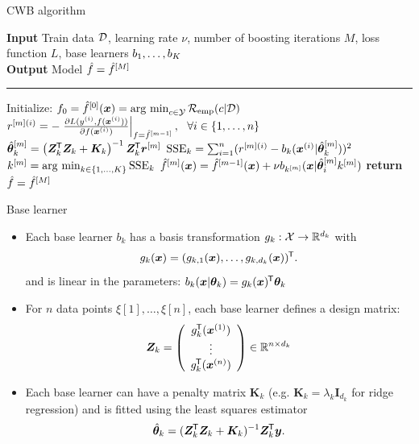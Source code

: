 \documentclass[t,10pt]{beamer}
\newcommand{\penMat}{\bm{K}}
\begin{document}
\begin{frame}{CWB algorithm}
  \addtocounter{algorithm}{-1}
  \begin{algorithm}[H]
  \footnotesize
  \caption{Vanilla CWB algorithm}\label{algo:cwb}
  \hspace*{\algorithmicindent} \textbf{Input} Train data $\D$, learning rate $\nu$, number of boosting iterations $M$, loss\\
  \hspace*{\algorithmicindent}  function $L$, base learners $b_1, \dots, b_\blK$\\
  \hspace*{\algorithmicindent} \textbf{Output} Model $\fh = \fmh[M]$\vspace{0.1cm}
  \hrule
  \begin{algorithmic}[1]
      \State Initialize: $f_0 = \fh^{[0]}(\xv) = \argmin_{c\in\mathcal{Y}}\riske(c|\D)$
          \State $\rmi = -\left.\pd{\Lxyi}{f(\xi)}\right|_{f = \fmdh},\ \ \forall i \in \{1, \dots, n\}$
              \State $\tbmh_\blk = \left(\design_\blk^\tran \design_\blk + \bm{K}_\blk\right)^{-1} \design^\tran_\blk \rmm$
              \State $\sse_\blk = \sum_{i=1}^n(\rmi - b_\blk(\xi | \tbmh_\blk))^2$
          \EndFor
          \State $\blk^{[m]} = \argmin_{\blk\in\{1, \dots, \blK\}} \sse_\blk$
          \State $\fmh(\xv) = \fmdh(\xv) + \nu b_{\blk^{[m]}} (\xv | \tbmh_i{\blk^{[m]}})$
      \EndWhile
      \State \textbf{return} $\fh = \fh^{[M]}$
  \EndProcedure
  \end{algorithmic}
  \end{algorithm}
  \addtocounter{framenumber}{-1}
\end{frame}

\begin{frame}{Base learner}
  \begin{itemize}
    \item
      Each base learner $b_k$ has a basis transformation $g_k : \Xspace \to \R^{d_k}$ with \[g_k(\xv) = (g_{k,1}(\xv), \dots, g_{k,d_k}(\xv))^\tran.\] and is linear in the parameters: $b_k(\xv | \tb_k) = g_k(\xv)^\tran \tb_k$

    \item
      For $n$ data points $\xi[1], \dots, \xi[n]$, each base learner defines a design matrix: \[
      \design_k = \left(\begin{array}{c}
      g_{k}^\tran(\xi[1]) \\
      \vdots \\
      g_{k}^\tran(\xi[n])\end{array}\right)\in\R^{n\times d_k}\]

    \item
      Each base learner can have a penalty matrix $\penMat_k$ (e.g. $\penMat_k = \lambda_k\bm{I}_{d_k}$ for ridge regression) and is fitted using the least squares estimator \[\tbh_k = (\design_\blk^\tran \design_\blk + \penMat_k)^{-1} \design_k^\tran \yv.\]
  \end{itemize}
\end{frame}
\end{document}

